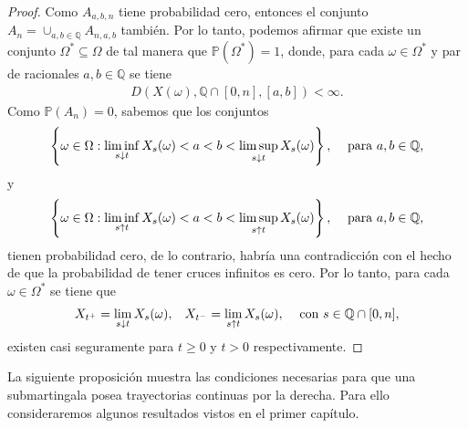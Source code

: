 \begin{proof}
Como $A_{a, b, n}$ tiene probabilidad cero, entonces el conjunto $A_n = \cup_{a, b \in \mathbb{Q}} A_{n, a, b}$ también. Por lo tanto, podemos afirmar que existe un conjunto $\Omega^{*} \subseteq \Omega$ de tal manera que $\mathbb{P}(\Omega^{*}) = 1$, donde, para cada $\omega \in \Omega^{*}$ y par de racionales $a, b \in \mathbb{Q}$ se tiene 
\begin{align*}
	D(X(\omega), \mathbb{Q} \cap [0, n], [a, b]) < \infty.
\end{align*}
Como $\mathbb{P}(A_{n}) = 0$, sabemos que los conjuntos
\begin{align*}
	\left\{ \omega \in \Omega : \liminf_{s \downarrow t} X_s (\omega) < a < b < \limsup_{s \downarrow t} X_s (\omega) \right\}, \hspace{0.3cm} \text{ para } a, b \in \mathbb{Q},
\end{align*}
y
\begin{align*}
	\left\{ \omega \in \Omega : \liminf_{s \uparrow t} X_s (\omega) < a < b < \limsup_{s \uparrow t} X_s (\omega) \right\}, \hspace{0.3cm} \text{ para } a, b \in \mathbb{Q},
\end{align*}
tienen probabilidad cero, de lo contrario, habría una contradicción con el hecho de que la probabilidad de tener cruces infinitos es cero. Por lo tanto, para cada $\omega \in \Omega^{*}$ se tiene que 
\begin{align*}
	X_{t^{+}} = \lim_{s \downarrow t} X_s(\omega), \hspace{0.3cm} X_{t^{-}} = \lim_{s \uparrow t} X_s(\omega), \hspace{0.3cm} \text{ con } s \in \mathbb{Q} \cap [0, n],
\end{align*}
existen casi seguramente para $t \geq 0$ y $t > 0$ respectivamente.
\end{proof}

La siguiente proposición muestra las condiciones necesarias para que una submartingala posea trayectorias continuas por la derecha. Para ello consideraremos algunos resultados vistos en el primer capítulo.

